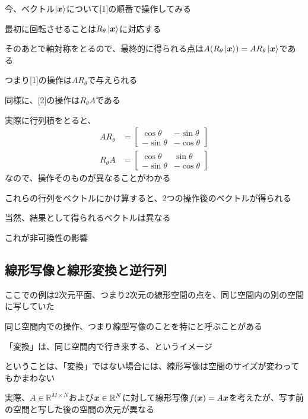 \documentclass[../book_half_step_linear]{subfiles}
\begin{document}
\br

今、ベクトル$\ket{\vb*{x}}$について[1]の順番で操作してみる

最初に回転させることは$R_\theta\ket{\vb*{x}}$に対応する

そのあとで軸対称をとるので、最終的に得られる点は$A(R_\theta\ket{\vb*{x}}) = A R_\theta \ket{\vb*{x}}$である

つまり[1]の操作は$AR_\theta$で与えられる

同様に、[2]の操作は$R_\theta A$である

\br

実際に行列積をとると、
\begin{align*}
  AR_\theta  & = \begin{bmatrix}
                   \cos\theta  & -\sin\theta \\
                   -\sin\theta & -\cos\theta
                 \end{bmatrix} \\
  R_\theta A & = \begin{bmatrix}
                   \cos\theta  & \sin\theta  \\
                   -\sin\theta & -\cos\theta
                 \end{bmatrix}
\end{align*}
なので、操作そのものが異なることがわかる

\br

これらの行列をベクトルにかけ算すると、2つの操作後のベクトルが得られる

当然、結果として得られるベクトルは異なる

これが非可換性の影響

\sectionline
\subsection{線形写像と線形変換と逆行列}

ここでの例は2次元平面、つまり2次元の線形空間の点を、同じ空間内の別の空間に写していた

同じ空間内での操作、つまり線型写像のことを特にと呼ぶことがある

\br

「変換」は、同じ空間内で行き来する、というイメージ

ということは、「変換」ではない場合には、線形写像は空間のサイズが変わってもかまわない

\br

実際、$A \in \mathbb{R}^{M \times N}$および$\vb*{x} \in \mathbb{R}^N$に対して線形写像$f(\vb*{x}) = A\vb*{x}$を考えたが、写す前の空間と写した後の空間の次元が異なる
\end{document}
